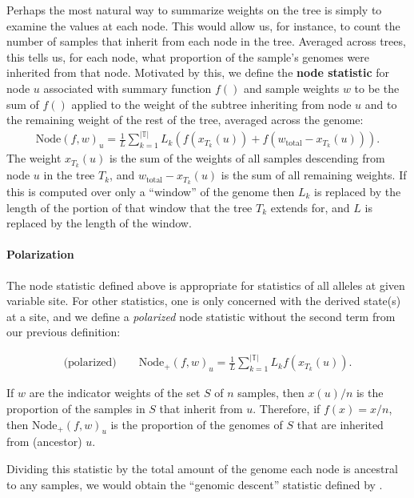 \documentclass{article}
\newcommand{\node}{\mbox{Node}} %
\newcommand{\nodep}{\mbox{Node}_+} %
\newcommand{\treeseq}{\mathbb{T}} %
\newcommand{\iw}{w} %
\newcommand{\tiw}{w_\text{total}} %
\newcommand{\nw}{x} %
\begin{document}
Perhaps the most natural way to summarize weights on the tree
is simply to examine the values at each node.
This would allow us, for instance, to
count the number of samples that inherit from each node in the tree.
Averaged across trees,
this tells us, for each node, what proportion of the sample's genomes were inherited from that node.
Motivated by this, we define the
\textbf{node statistic} for node $u$
associated with summary function $f()$ and sample weights $\iw$
to be the sum of $f()$ applied to the weight of the subtree inheriting from node $u$
and to the remaining weight of the rest of the tree,
averaged across the genome:
\begin{align}
    \node(f, \iw)_u
    =
    \frac{1}{L} \sum_{k=1}^{|\treeseq|} L_k \left( f(\nw_{T_k}(u)) + f(\tiw - \nw_{T_k}(u)) \right).
\end{align}
The weight $\nw_{T_k}(u)$ is the sum of the weights of all samples descending from node $u$
in the tree $T_k$,
and $\tiw - \nw_{T_k}(u)$ is the sum of all remaining weights.
If this is computed over only a ``window'' of the genome
then $L_k$ is replaced by the length of the portion of that window that the tree $T_k$ extends for,
and $L$ is replaced by the length of the window.

\paragraph{Polarization}
The node statistic defined above is appropriate for statistics of all alleles at given variable site.
For other statistics, one is only concerned with the derived state(s) at a site,
and we define a \emph{polarized} node statistic without the second term from our previous definition:

\begin{align}
    \text{(polarized)} \qquad
    \nodep(f, \iw)_u
    =
    \frac{1}{L} \sum_{k=1}^{|\treeseq|} L_k f(\nw_{T_k}(u)) .
\end{align}

\begin{example} \label{ex:ancestry_props} 
    If $\iw$ are the indicator weights of the set $S$ of $n$ samples,
    then $\nw(u) / n$ is the proportion of the samples in $S$ that inherit from $u$.
    Therefore, if $f(x) = x / n$,
    then $\nodep(f, \iw)_u$ is the proportion of the genomes of $S$
    that are inherited from (ancestor) $u$.
\end{example}

Dividing this statistic by the total amount of the genome each node is ancestral to any samples,
we would obtain the ``genomic descent'' statistic defined by \citet{scheib2019anglian}.
\end{document}
